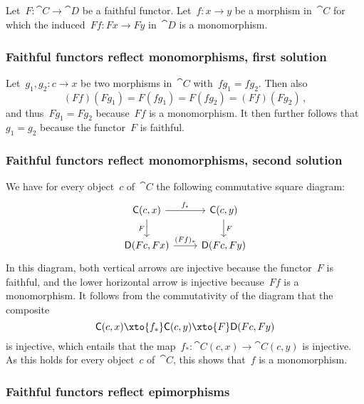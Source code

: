 \subsection{}

Let~$F \colon \cat{C} \to \cat{D}$ be a faithful functor.
Let~$f \colon x \to y$ be a morphism in~$\cat{C}$ for which the induced~$F f \colon F x \to F y$ in~$\cat{D}$ is a monomorphism.



\subsubsection*{Faithful functors reflect monomorphisms, first solution}

Let~$g_1, g_2 \colon c \to x$ be two morphisms in~$\cat{C}$ with~$f g_1 = f g_2$.
Then also
\[
	(F f) (F g_1) = F (f g_1) = F (f g_2) = (F f) (F g_2) \,,
\]
and thus~$F g_1 = F g_2$ because~$F f$ is a monomorphism.
It then further follows that~$g_1 = g_2$ because the functor~$F$ is faithful.



\subsubsection*{Faithful functors reflect monomorphisms, second solution}

We have for every object~$c$ of~$\cat{C}$ the following commutative square diagram:
\[
	\begin{tikzcd}
		\cat{C}(c, x)
		\arrow{r}[above]{f_*}
		\arrow{d}[left]{F}
		&
		\cat{C}(c, y)
		\arrow{d}[right]{F}
		\\
		\cat{D}(F c, F x)
		\arrow{r}[above]{(F f)_*}
		&
		\cat{D}(F c, F y)
	\end{tikzcd}
\]
In this diagram, both vertical arrows are injective because the functor~$F$ is faithful, and the lower horizontal arrow is injective because~$F f$ is a monomorphism.
It follows from the commutativity of the diagram that the composite
\[
	\cat{C}(c, x)
	\xto{f_*}
	\cat{C}(c, y)
	\xto{F}
	\cat{D}(F c, F y)
\]
is injective, which entails that the map~$f_* \colon \cat{C}(c, x) \to \cat{C}(c, y)$ is injective.
As this holds for every object~$c$ of~$\cat{C}$, this shows that~$f$ is a monomorphism.



\subsubsection*{Faithful functors reflect epimorphisms}

